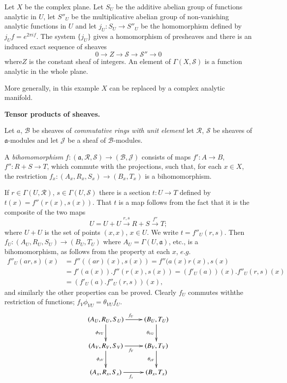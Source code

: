 \begin{exam}%
Let $X$ be the complex plane. Let $S_U$ be the additive abelian group
of functions analytic in $U$, let $S''_U$ be the multiplicative
abelian group of non-vanishing analytic functions in $U$ and let $j_U
: S_U \to S''_U$ be the homomorphism defined by $j_Uf = e^{2 \pi 
  if}$. The system $\{j_U\}$ gives a homomorphism of presheaves and
there is an induced exact sequence of sheaves  
$$
0 \to Z \to \mathscr{S} \to \mathscr{S}'' \to 0
$$
where\pageoriginale $Z$ is the constant sheaf of integers. An element
of $\Gamma (X, \mathscr{S})$ is a function analytic in the whole
plane.  
\end{exam}

More generally, in this example $X$ can be replaced by a complex
analytic manifold. 

\medskip
\noindent
\textbf{Tensor products of sheaves.} 

Let $a$, $\mathscr{B}$ be sheaves of \textit{commutative rings with unit
  element} let $\mathscr{R}$, $\mathscr{S}$ be sheaves of
$\mathfrak{a}$-modules and let $\mathcal{J}$ be a sheaf of
$\mathscr{B}$-modules.  

\begin{defi*}
A {\em bihomomorphism} $f : (\mathfrak{a} ,\mathscr{R},\mathscr{S}) \to
(\mathscr{B}, \mathcal{J})$ consists of maps $f' : A \to B$, $f'' : R +
S \to T$, which commute with the projections, such that, for each $x
\in X$, the restriction $f_x : (A_x, R_x, S_x) \to (B_x, T_x)$ is a
bihomomorphism. 
\end{defi*}

If $r \in \Gamma (U, \mathscr{R})$, $s \in \Gamma(U,
\mathscr{S})$ there is a section $t : U \to T$ defined by $t(x) = f''
( r(x), s(x))$. That $t$ is a map follows from the fact that it is the
composite of the two maps  
$$
U = U + U \xrightarrow{r, s} R+S \xrightarrow{f''} T ; 
$$
where $U+U$ is the set of points $(x,x)$, $x \in U$. We write $t=f''_U
(r,s)$. Then $f_U : (A_U, R_U, S_U) \to (B_U, T_U)$ where $A_U =
\Gamma (U, \mathfrak{a})$, etc., is a bihomomorphism, as follows from
the property at each $x$, $e.g$.  
\begin{align*}
f''_U (ar, s)(x) & = f''((ar)(x), s(x)) = f''(a(x) r(x), s(x)\\
& = f'(a(x)). f''(r(x), s(x)) = (f'_U(a))(x). f''_U(r,s)(x)\\
& = (f'_U(a). f''_U (r,s)) (x),
\end{align*}
and similarly the other properties can be proved. Clearly $f_U$
commutes with\pageoriginale the restriction of functions; $f_V
\phi_{VU}= \theta_{VU} f_U$.  
\[
\xymatrix{
(A_U, R_U, S_U) \ar[r]^{f_U} \ar[d]_{\phi_{VU}} & (B_U,
  T_U)\ar[d]_{\theta_{VU}}\\
(A_V, R_V, S_V) \ar[r]_{f_V} \ar[d]_{\phi_{xV}} & (B_V,
  T_V)\ar[d]_{\theta_{xV}}\\
(A_x, R_x,S_x) \ar[r]_{f_x} & (B_x,T_x)
}
\]


